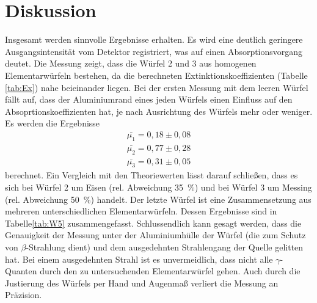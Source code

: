 \section{Diskussion}
\label{sec:Diskussion}
Insgesamt werden sinnvolle Ergebnisse erhalten.
Es wird eine deutlich geringere Ausgangsintensität vom Detektor registriert, was auf einen Absorptionsvorgang deutet.
Die Messung zeigt, dass die Würfel 2 und 3 aus homogenen Elementarwürfeln bestehen, da die berechneten Extinktionskoeffizienten (Tabelle \ref{tab:Ex}) nahe beieinander liegen.
Bei der ersten Messung mit dem leeren Würfel fällt auf, dass der Aluminiumrand eines jeden Würfels einen Einfluss auf den Absoprtionskoeffizienten hat, je nach Ausrichtung des Würfels mehr oder weniger.
Es werden die Ergebnisse 
\begin{align*}
    \bar{\mu_1}=0,18\pm0,08\\
    \bar{\mu_2}=0,77\pm0,28\\
    \bar{\mu_3}=0,31\pm0,05
\end{align*}
berechnet.
Ein Vergleich mit den Theoriewerten lässt darauf schließen, dass es sich bei Würfel 2 um Eisen (rel. Abweichung \SI{35}{\percent}) und bei Würfel 3 um Messing (rel. Abweichung \SI{50}{\percent}) handelt.
Der letzte Würfel ist eine Zusammensetzung aus mehreren unterschiedlichen Elementarwürfeln.
Dessen Ergebnisse sind in Tabelle\ref{tab:W5} zusammengefasst.
Schlussendlich kann gesagt werden, dass die Genauigkeit der Messung unter der Aluminiumhülle der Würfel (die zum Schutz von $\beta$-Strahlung dient) und dem ausgedehnten Strahlengang der Quelle gelitten hat.
Bei einem ausgedehnten Strahl ist es unvermeidlich, dass nicht alle $\gamma$-Quanten durch den zu untersuchenden Elementarwürfel gehen.
Auch durch die Justierung des Würfels per Hand und Augenmaß verliert die Messung an Präzision.